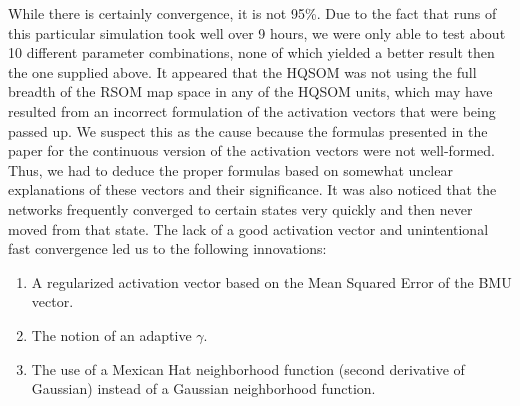 \documentclass[a4paper,10pt]{article}
\begin{document}
While there is certainly convergence, it is not 95\%.  Due to the fact that runs of this particular
simulation took well over 9 hours, we were only able to test about 10 different
parameter combinations, none of which yielded a better result then the one supplied above.  It
appeared that the HQSOM was not using the full breadth of the RSOM map space in any of the HQSOM
units, which may have resulted from an incorrect formulation of the activation vectors that were
being passed up.  We suspect this as the cause because the formulas presented in the paper for the
continuous version of the activation vectors were not well-formed.  Thus, we had to deduce the
proper formulas based on somewhat unclear explanations of these vectors and their significance.  It
was also noticed that the networks frequently converged to certain states very quickly
and then never moved from that state.  The lack of a good activation vector and unintentional fast
convergence
led us to the following innovations:
\begin{enumerate}
\item A regularized activation vector based on the Mean Squared Error of the BMU vector.
\item The notion of an adaptive $\gamma$.
\item The use of a Mexican Hat neighborhood function (second derivative of Gaussian) instead of a
Gaussian neighborhood function.
\end{enumerate}
 
\end{document}
